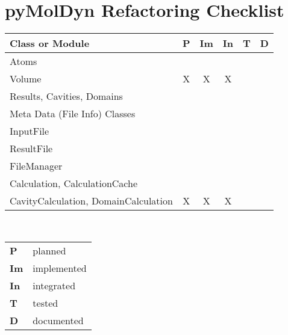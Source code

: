 \documentclass[final, oneside, a4paper, 11pt, pdftex, english]{scrreprt}
\begin{document}
\chapter*{pyMolDyn Refactoring Checklist}

\begin{tabular}{|l|c|c|c|c|c|}
    \hline
    \textbf{Class or Module} & \textbf{P} & \textbf{Im} & \textbf{In} & \textbf{T} & \textbf{D}\\
    \hline
    Atoms & & & & & \\
    \hline
    Volume & X & X & X & & \\
    \hline
    Results, Cavities, Domains & & & & &\\
    \hline
    Meta Data (File Info) Classes & & & & & \\
    \hline
    InputFile & & & & & \\
    \hline
    ResultFile & & & & & \\
    \hline
    FileManager & & & & & \\
    \hline
    Calculation, CalculationCache & & & & & \\
    \hline
    CavityCalculation, DomainCalculation & X & X & X & & \\
    \hline
\end{tabular}
\\[\baselineskip]
\begin{tabular}{|l l|}
    \hline
    \textbf{P} & planned \\
    \textbf{Im} & implemented \\
    \textbf{In} & integrated \\
    \textbf{T} & tested \\
    \textbf{D} & documented \\
    \hline
\end{tabular}
\end{document}
